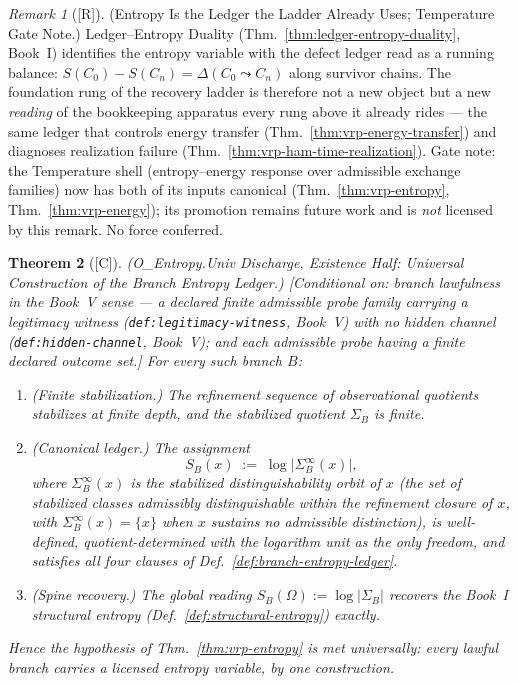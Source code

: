 \documentclass[12pt,oneside]{amsbook}
\theoremstyle{plain}
\newtheorem{theorem}{Theorem}[section]
\theoremstyle{definition}
\theoremstyle{remark}
\newtheorem{remark}[theorem]{Remark}
\newcommand{\status}[1]{\textup{[#1]}}
\begin{document}
\begin{remark}[\status{R}]\label{rmk:vrp-entropy-ledger-duality}
\textup{(Entropy Is the Ledger the Ladder Already Uses;
Temperature Gate Note.)}
Ledger--Entropy Duality (Thm.~\ref{thm:ledger-entropy-duality},
Book~I) identifies the entropy variable with the defect ledger
read as a running balance: $S(C_0) - S(C_n) = \Delta(C_0 \leadsto
C_n)$ along survivor chains.  The foundation rung of the recovery
ladder is therefore not a new object but a new \emph{reading} of
the bookkeeping apparatus every rung above it already rides ---
the same ledger that controls energy transfer
(Thm.~\ref{thm:vrp-energy-transfer}) and diagnoses realization
failure (Thm.~\ref{thm:vrp-ham-time-realization}).  Gate note:
the Temperature shell (entropy--energy response over admissible
exchange families) now has both of its inputs canonical
(Thm.~\ref{thm:vrp-entropy}, Thm.~\ref{thm:vrp-energy}); its
promotion remains future work and is \emph{not} licensed by this
remark.  No force conferred.
\end{remark}

\begin{theorem}[\status{C}]\label{thm:vrp-entropy-univ}
\textup{(O\_Entropy.Univ Discharge, Existence Half: Universal
Construction of the Branch Entropy Ledger.)}
\textup{[Conditional on: branch lawfulness in the Book~V sense ---
a declared finite admissible probe family carrying a legitimacy
witness (\texttt{def:legitimacy-witness}, Book~V) with no hidden
channel (\texttt{def:hidden-channel}, Book~V); and each admissible
probe having a finite declared outcome set.]}
For every such branch $B$:
\begin{enumerate}[label=\textup{(\arabic*)}]
  \item \emph{(Finite stabilization.)}  The refinement sequence of
    observational quotients stabilizes at finite depth, and the
    stabilized quotient $\Sigma_B$ is finite.
  \item \emph{(Canonical ledger.)}  The assignment
    \[
      S_B(x) \;:=\; \log\bigl|\Sigma_B^\infty(x)\bigr|,
    \]
    where $\Sigma_B^\infty(x)$ is the stabilized
    distinguishability orbit of $x$ (the set of stabilized classes
    admissibly distinguishable within the refinement closure of
    $x$, with $\Sigma_B^\infty(x) = \{x\}$ when $x$ sustains no
    admissible distinction), is well-defined, quotient-determined
    with the logarithm unit as the \emph{only} freedom, and
    satisfies all four clauses of
    Def.~\ref{def:branch-entropy-ledger}.
  \item \emph{(Spine recovery.)}  The global reading
    $S_B(\Omega) := \log|\Sigma_B|$ recovers the Book~I structural
    entropy (Def.~\ref{def:structural-entropy}) exactly.
\end{enumerate}
Hence the hypothesis of Thm.~\ref{thm:vrp-entropy} is met
universally: every lawful branch carries a licensed entropy
variable, by one construction.
\end{theorem}
\end{document}
